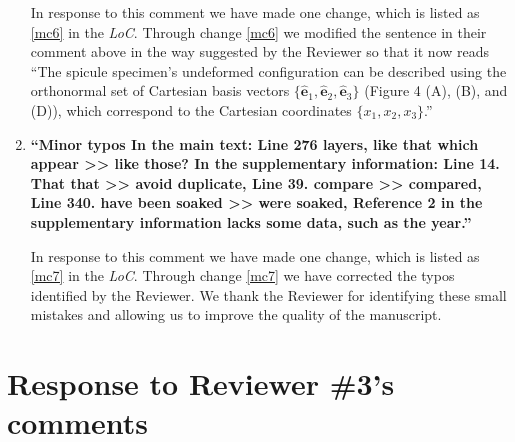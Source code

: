 \documentclass[11pt,letterpaper]{report}
\newcommand{\ex}{{\bm{\hat{e}}}_1}
\newcommand{\ey}{{\bm{\hat{e}}}_2}
\newcommand{\ez}{{\bm{\hat{e}}}_3}
\begin{document}
\begin{enumerate}[label=\textit{2.\arabic*},wide, labelwidth=!, labelindent=0pt]
In response to this comment we have made one change, which is listed as \ref{mc6} in the \textit{LoC}.
%
Through change \ref{mc6} we modified the sentence in their comment above in the way suggested by the Reviewer so that it now reads ``The spicule specimen's undeformed configuration can be described using the orthonormal set of Cartesian basis vectors $\{\ex,\ey,\ez\}$ (Figure 4 (A), (B), and (D)), which correspond to the Cartesian coordinates $\{x_1,x_2,x_3\}$.''

\item \label{r2c10} {\bf ``Minor typos
In the main text: Line 276 layers, like that which appear >> like those? In the supplementary information: Line 14. That that >> avoid duplicate, Line 39. compare >> compared, Line 340. have been soaked >> were soaked, Reference 2 in the supplementary information lacks some data, such as the year.''}

In response to this comment we have made one change, which is listed as \ref{mc7} in the \textit{LoC}.
%
Through change \ref{mc7} we have corrected the typos identified by the Reviewer. We thank the Reviewer for identifying these small mistakes and allowing us to improve the quality of the manuscript.

\end{enumerate}

\clearpage
\section*{Response to Reviewer \#3's comments}
\label{rev3}
\end{document}
